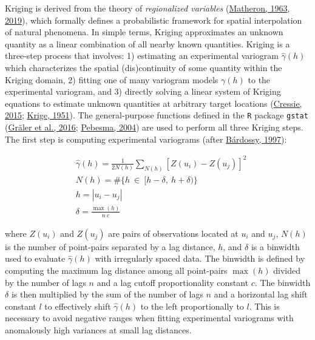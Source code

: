 Kriging is derived from the theory of \emph{regionalized variables} (\protect\hyperlink{ref-matheron1963}{Matheron, 1963}, \protect\hyperlink{ref-matheron2019}{2019}), which formally defines a probabilistic framework for spatial interpolation of natural phenomena. In simple terms, Kriging approximates an unknown quantity as a linear combination of all nearby known quantities. Kriging is a three-step process that involves: 1) estimating an experimental variogram \(\hat{\gamma}(h)\) which characterizes the spatial (dis)continuity of some quantity within the Kriging domain, 2) fitting one of many variogram models \(\gamma(h)\) to the experimental variogram, and 3) directly solving a linear system of Kriging equations to estimate unknown quantities at arbitrary target locations (\protect\hyperlink{ref-cressie2015}{Cressie, 2015}; \protect\hyperlink{ref-krige1951}{Krige, 1951}). The general-purpose functions defined in the \texttt{R} package \texttt{gstat} (\protect\hyperlink{ref-graler2016}{Gräler et al., 2016}; \protect\hyperlink{ref-pebesma2004}{Pebesma, 2004}) are used to perform all three Kriging steps. The first step is computing experimental variograms (after \protect\hyperlink{ref-bardossy1997}{Bárdossy, 1997}):

\begin{equation}
  \begin{aligned}
    &\hat{\gamma}(h) = \frac{1}{2N(h)}\sum_{N(h)}^{}[Z(u_i) - Z(u_j)]^2 \\
    &N(h) = \#\{h \  \in \  [h - \delta,\  h + \delta)\} \\
    &h = |u_i - u_j| \\
    &\delta = \frac{\max(h)}{n\ c}
  \end{aligned}
  \label{eq:variogram}
\end{equation}

where \(Z(u_i)\) and \(Z(u_j)\) are pairs of observations located at \(u_i\) and \(u_j\), \(N(h)\) is the number of point-pairs separated by a lag distance, \(h\), and \(\delta\) is a binwidth used to evaluate \(\hat{\gamma}(h)\) with irregularly spaced data. The binwidth is defined by computing the maximum lag distance among all point-pairs \(\max(h)\) divided by the number of lags \(n\) and a lag cutoff proportionality constant \(c\). The binwidth \(\delta\) is then multiplied by the sum of the number of lags \(n\) and a horizontal lag shift constant \(l\) to effectively shift \(\hat{\gamma}(h)\) to the left proportionally to \(l\). This is necessary to avoid negative ranges when fitting experimental variograms with anomalously high variances at small lag distances.

